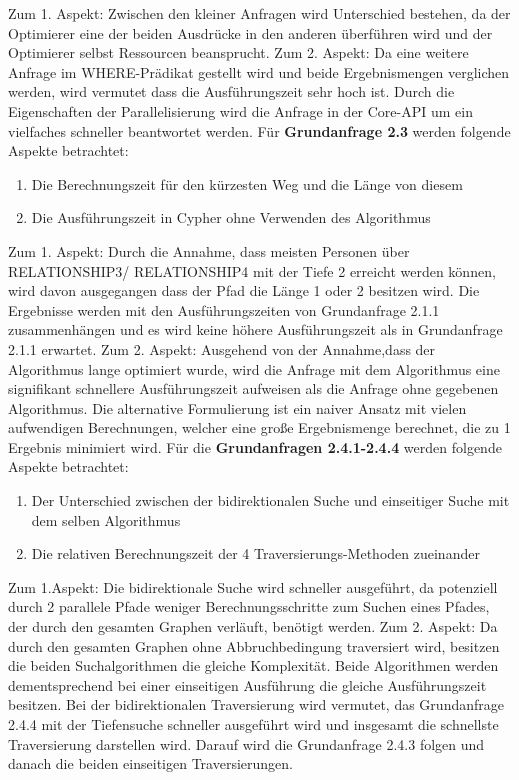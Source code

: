 Zum 1. Aspekt: Zwischen den kleiner Anfragen wird Unterschied bestehen, da der Optimierer eine der beiden Ausdrücke in den anderen überführen wird und der Optimierer selbst Ressourcen beansprucht. \newline
Zum 2. Aspekt: Da eine weitere Anfrage im WHERE-Prädikat gestellt wird und beide Ergebnismengen verglichen werden, wird vermutet dass die Ausführungszeit sehr hoch ist. Durch die Eigenschaften der Parallelisierung wird die Anfrage in der Core-API um ein vielfaches schneller beantwortet werden. \newline  \newline
Für \textbf{Grundanfrage 2.3} werden folgende Aspekte betrachtet: 
\begin{enumerate}
	\item Die Berechnungszeit für den kürzesten Weg und die Länge von diesem
	\item Die Ausführungszeit in Cypher ohne Verwenden des Algorithmus
\end{enumerate}
Zum 1. Aspekt: Durch die Annahme, dass meisten Personen über RELATIONSHIP3/ RELATIONSHIP4 mit der Tiefe 2 erreicht werden können, wird davon ausgegangen dass der Pfad die Länge 1 oder 2 besitzen  wird. Die Ergebnisse werden mit den Ausführungszeiten von Grundanfrage 2.1.1 zusammenhängen und es wird keine höhere Ausführungszeit als in Grundanfrage 2.1.1 erwartet. \newline
Zum 2. Aspekt: Ausgehend von der Annahme,dass der Algorithmus lange optimiert wurde, wird die Anfrage mit dem Algorithmus eine signifikant schnellere Ausführungszeit aufweisen als die Anfrage ohne gegebenen Algorithmus. Die alternative Formulierung ist ein naiver Ansatz mit vielen aufwendigen Berechnungen, welcher eine große Ergebnismenge berechnet, die zu 1 Ergebnis minimiert wird. \newline \newline
Für die \textbf{Grundanfragen 2.4.1-2.4.4} werden folgende Aspekte betrachtet:
\begin{enumerate}
	\item Der Unterschied zwischen der bidirektionalen Suche und einseitiger Suche mit dem selben Algorithmus
	\item Die relativen Berechnungszeit der 4 Traversierungs-Methoden zueinander
\end{enumerate}
Zum 1.Aspekt: Die bidirektionale Suche wird schneller ausgeführt, da potenziell durch 2 parallele Pfade  weniger Berechnungsschritte zum Suchen eines Pfades, der  durch den gesamten Graphen verläuft, benötigt werden. \newline 
Zum 2. Aspekt: Da durch den gesamten Graphen ohne Abbruchbedingung traversiert wird, besitzen die beiden Suchalgorithmen die gleiche Komplexität. Beide Algorithmen werden dementsprechend bei einer einseitigen Ausführung die gleiche Ausführungszeit besitzen. Bei der bidirektionalen Traversierung wird vermutet, das Grundanfrage 2.4.4 mit der Tiefensuche schneller ausgeführt wird und insgesamt die schnellste Traversierung darstellen wird. Darauf wird die Grundanfrage 2.4.3 folgen und danach die beiden einseitigen Traversierungen. 
